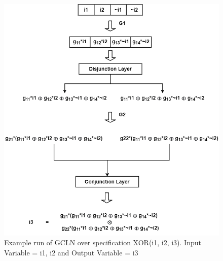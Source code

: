 \begin{figure}
	\centering
    \includegraphics[scale=0.3]{example.png}
    \caption{Example run of GCLN over specification XOR(i1, i2, i3). Input Variable = i1, i2 and Output Variable = i3}
    \label{fig:ex}
\end{figure}

